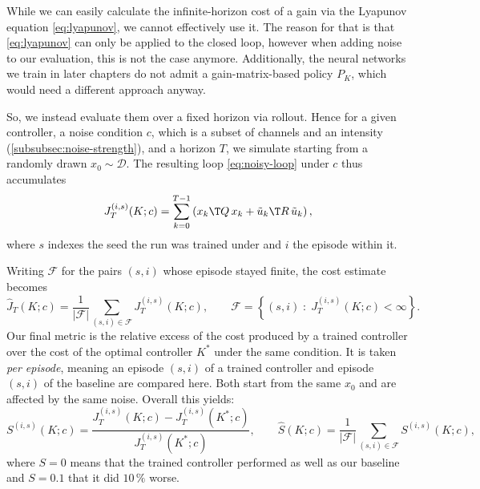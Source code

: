 While we can easily calculate the infinite-horizon cost of a gain
via the Lyapunov equation \eqref{eq:lyapunov}, we cannot effectively
use it. The reason for that is that \eqref{eq:lyapunov} can only
be applied to the closed loop, however when adding noise to our
evaluation, this is not the case anymore. Additionally, the neural
networks we train in later chapters do not admit a gain-matrix-based
policy $P_K$, which would need a different approach anyway.

So, we instead evaluate them over a fixed horizon via rollout. Hence for
a given controller, a noise condition $c$, which is a subset of channels and an
intensity (\cref{subsubsec:noise-strength}), and a horizon $T$, we
simulate starting from a randomly drawn $x_0 \sim \mathcal{D}$.
The resulting loop \eqref{eq:noisy-loop} under $c$ thus accumulates
\begin{equation}
    \label{eq:empirical-return}
    J_T^{(i,s)}(K; c)
    = \sum_{k=0}^{T-1}
      \left( x_k\T Q\, x_k + \tilde{u}_k\T R\, \tilde{u}_k \right) ,
\end{equation}
where $s$ indexes the seed the run was trained under and $i$ the episode
within it.

Writing $\mathcal{F}$ for the pairs $(s,i)$ whose episode stayed finite,
the cost estimate becomes
\begin{equation}
    \label{eq:empirical-cost}
    \hat{J}_T(K; c)
    = \frac{1}{\lvert \mathcal{F} \rvert}
      \sum_{(s,i) \in \mathcal{F}} J^{(i,s)}_T(K; c) ,
    \qquad
    \mathcal{F} = \left\{ (s,i) \;:\; J^{(i,s)}_T(K; c) < \infty \right\} .
\end{equation}
Our final metric is the relative excess of the cost produced by a
trained controller over the cost of the optimal controller $K^{*}$
under the same condition. It is taken \emph{per episode}, meaning
an episode $(s,i)$ of a trained controller and episode $(s,i)$ of the baseline
are compared here. Both start from the same $x_0$ and are affected by 
the same noise. Overall this yields:
\begin{equation}
    \label{eq:suboptimality}
    S^{(i,s)}(K; c)
        = \frac{J^{(i,s)}_T(K; c) - J^{(i,s)}_T(K^{*}; c)}
                {J^{(i,s)}_T(K^{*}; c)} ,
    \qquad
    \hat{S}(K; c)
        = \frac{1}{\lvert \mathcal{F} \rvert}
          \sum_{(s,i) \in \mathcal{F}} S^{(i,s)}(K; c) ,
\end{equation}
where $S = 0$ means that the trained controller performed as well
as our baseline and $S = 0.1$ that it did $10\,\%$ worse.

